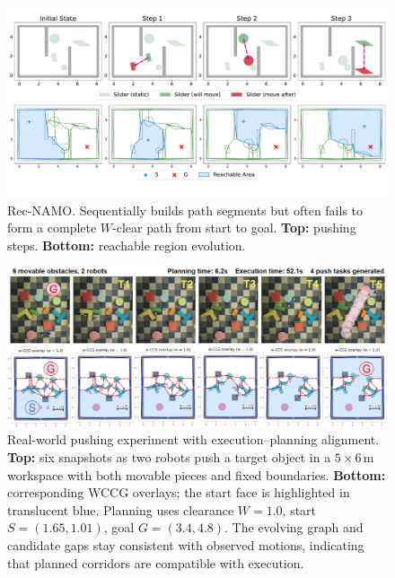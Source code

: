 
\begin{figure}[t!]
  \centering
  \vspace{-3mm}
  \includegraphics[width=\columnwidth]{figures/Rec_NAMO.pdf}
  \vspace{-10mm}
  \caption{Rec-NAMO. Sequentially builds path segments but often fails to form a complete $W$-clear path from start to goal. \textbf{Top:} pushing steps. \textbf{Bottom:} reachable region evolution.}
  \label{fig:Rec-NAMO}
\end{figure}
\begin{figure}[t]
  \centering
  \includegraphics[width=\linewidth]{figures/hardware_wccg.png}
  \vspace{-2mm}
  \caption{Real-world pushing experiment with execution--planning alignment. \textbf{Top:} six snapshots as two robots push a target object in a \(5{\times}6\,\mathrm{m}\) workspace with both movable pieces and fixed boundaries. \textbf{Bottom:} corresponding WCCG overlays; the start face is highlighted in translucent blue. Planning uses clearance \(W{=}1.0\), start \(S{=}(1.65,1.01)\), goal \(G{=}(3.4,4.8)\). The evolving graph and candidate gaps stay consistent with observed motions, indicating that planned corridors are compatible with execution.}
  \label{fig:hardware}
\end{figure}

